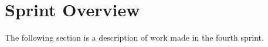 \section{Sprint Overview}

The following section is a description of work made in the fourth sprint.



